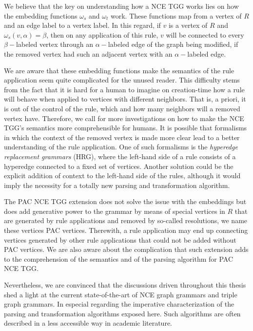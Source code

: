 We believe that the key on understanding how a NCE TGG works lies on how the embedding functions $\omega_s$ and $\omega_t$ work. These functions map from a vertex of $R$ and an edge label to a vertex label. In this regard, if $v$ is a vertex of $R$ and $\omega_s(v,\alpha) = \beta$, then on any application of this rule, $v$ will be connected to every $\beta-$labeled vertex through an $\alpha-$labeled edge of the graph being modified, if the removed vertex had such an adjacent vertex with an $\alpha-$labeled edge.

We are aware that these embedding functions make the semantics of the rule application seem quite complicated for the unused reader. This difficulty stems from the fact that it is hard for a human to imagine on creation-time how a rule will behave when applied to vertices with different neighbors. That is, a priori, it is out of the control of the rule, which and how many neighbors will a removed vertex have. Therefore, we call for more investigations on how to make the NCE TGG's semantics more comprehensible for humans. It is possible that formalisms in which the context of the removed vertex is made more clear lead to a better understanding of the rule application. One of such formalisms is the \emph{hyperedge replacement grammars} (HRG), where the left-hand side of a rule consists of a hyperedge connected to a fixed set of vertices. Another solution could be the explicit addition of context to the left-hand side of the rules, although it would imply the necessity for a totally new parsing and transformation algorithm.

The PAC NCE TGG extension does not solve the issue with the embeddings but does add generative power to the grammar by means of special vertices in $R$ that are generated by rule applications and removed by so-called resolutions, we name these vertices PAC vertices. Therewith, a rule application may end up connecting vertices generated by other rule applications that could not be added without PAC vertices. We are also aware about the complication that such extension adds to the comprehension of the semantics and of the parsing algorithm for PAC NCE TGG.

Nevertheless, we are convinced that the discussions driven throughout this thesis shed a light at the current state-of-the-art of NCE graph grammars and triple graph grammars. In especial regarding the imperative characterization of the parsing and transformation algorithms exposed here. Such algorithms are often described in a less accessible way in academic literature.

